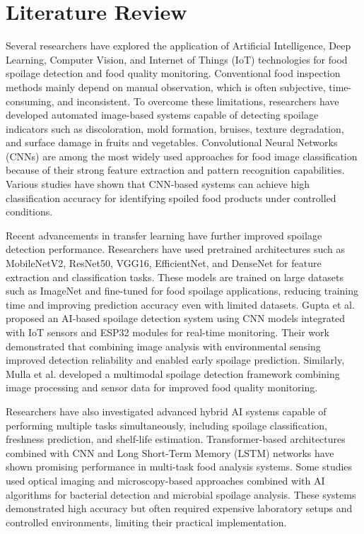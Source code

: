 \section[Literature Review]{\textbf{Literature Review}}
Several researchers have explored the application of Artificial Intelligence, Deep Learning, Computer Vision, and Internet of Things (IoT) technologies for food spoilage detection and food quality monitoring. Conventional food inspection methods mainly depend on manual observation, which is often subjective, time-consuming, and inconsistent. To overcome these limitations, researchers have developed automated image-based systems capable of detecting spoilage indicators such as discoloration, mold formation, bruises, texture degradation, and surface damage in fruits and vegetables. Convolutional Neural Networks (CNNs) are among the most widely used approaches for food image classification because of their strong feature extraction and pattern recognition capabilities. Various studies have shown that CNN-based systems can achieve high classification accuracy for identifying spoiled food products under controlled conditions.

Recent advancements in transfer learning have further improved spoilage detection performance. Researchers have used pretrained architectures such as MobileNetV2, ResNet50, VGG16, EfficientNet, and DenseNet for feature extraction and classification tasks. These models are trained on large datasets such as ImageNet and fine-tuned for food spoilage applications, reducing training time and improving prediction accuracy even with limited datasets. Gupta et al. proposed an AI-based spoilage detection system using CNN models integrated with IoT sensors and ESP32 modules for real-time monitoring. Their work demonstrated that combining image analysis with environmental sensing improved detection reliability and enabled early spoilage prediction. Similarly, Mulla et al. developed a multimodal spoilage detection framework combining image processing and sensor data for improved food quality monitoring.

Researchers have also investigated advanced hybrid AI systems capable of performing multiple tasks simultaneously, including spoilage classification, freshness prediction, and shelf-life estimation. Transformer-based architectures combined with CNN and Long Short-Term Memory (LSTM) networks have shown promising performance in multi-task food analysis systems. Some studies used optical imaging and microscopy-based approaches combined with AI algorithms for bacterial detection and microbial spoilage analysis. These systems demonstrated high accuracy but often required expensive laboratory setups and controlled environments, limiting their practical implementation.

